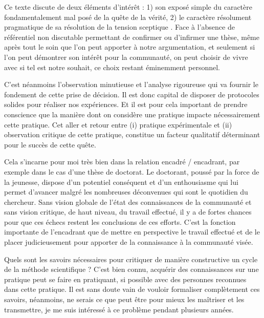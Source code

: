 Ce texte discute de deux éléments d'intérêt : 1) son exposé simple du caractère fondamentalement mal posé de la quête de la vérité, 2) le caractère résolument pragmatique de sa résolution de la \og tension sceptique \fg. Face à l'absence de référentiel non discutable permettant de confirmer ou d'infirmer une thèse, même après tout le soin que l'on peut apporter à notre argumentation, et seulement si l'on peut démontrer son intérêt pour la communauté, on peut choisir de vivre avec si tel est notre souhait, ce choix restant éminemment personnel.

C'est néanmoins l'observation minutieuse et l'analyse rigoureuse qui va fournir le fondement de cette prise de décision. Il est donc capital de disposer de protocoles solides pour réaliser nos expériences. Et il est pour cela important de prendre conscience que la manière dont on considère une pratique impacte nécessairement cette pratique. Cet aller et retour entre (i) pratique expérimentale et (ii) observation critique de cette pratique, constitue un facteur qualitatif déterminant pour le succès de cette quête.

Cela s'incarne pour moi très bien dans la relation encadré / encadrant, par exemple dans le cas d'une thèse de doctorat. Le doctorant, poussé par la force de la jeunesse, dispose d'un potentiel conséquent et d'un enthousiasme qui lui permet d'avancer malgré les nombreuses déconvenues qui sont le quotidien du chercheur. Sans vision globale de l'état des connaissances de la communauté et sans vision critique, de haut niveau, du travail effectué, il y a de fortes chances pour que ces \og échecs \fg restent les conclusions de ces efforts. C'est la fonction importante de l'encadrant que de mettre en perspective le travail effectué et de le placer judicieusement pour apporter de la connaissance à la communauté visée.


Quels sont les savoirs nécessaires pour critiquer de manière constructive un cycle de la méthode scientifique ? C'est bien connu, acquérir des connaissances sur une pratique peut se faire en pratiquant, si possible avec des personnes reconnues dans cette pratique. Il est sans doute vain de vouloir formaliser complètement ces savoirs, néanmoins, ne serais ce que peut être pour mieux les maîtriser et les transmettre, je me suis intéressé à ce problème pendant plusieurs années.

